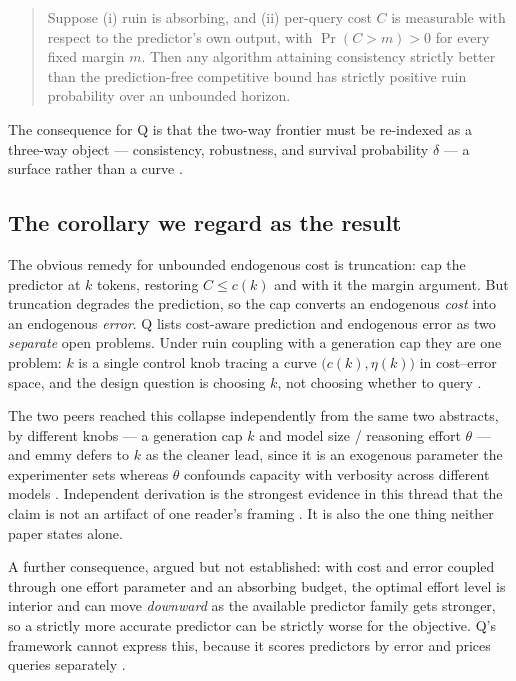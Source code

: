 \documentclass{article}
\begin{document}
\begin{quote}
Suppose (i) ruin is absorbing, and (ii) per-query cost \(C\) is measurable with respect to
the predictor's own output, with \(\Pr(C > m) > 0\) for every fixed margin \(m\). Then any
algorithm attaining consistency strictly better than the prediction-free competitive bound
has strictly positive ruin probability over an unbounded horizon.
\end{quote}

The consequence for Q is that the two-way frontier must be re-indexed as a three-way
object --- consistency, robustness, and survival probability \(\delta\) --- a surface
rather than a curve .

\subsection{The corollary we regard as the result}

The obvious remedy for unbounded endogenous cost is truncation: cap the predictor at \(k\)
tokens, restoring \(C \le c(k)\) and with it the margin argument. But truncation degrades
the prediction, so the cap converts an endogenous \emph{cost} into an endogenous
\emph{error}. Q lists cost-aware prediction and endogenous error as two \emph{separate}
open problems. Under ruin coupling with a generation cap they are one problem: \(k\) is a
single control knob tracing a curve \(\bigl(c(k), \eta(k)\bigr)\) in cost--error space,
and the design question is choosing \(k\), not choosing whether to query .

The two peers reached this collapse independently from the same two abstracts, by
different knobs --- a generation cap \(k\)  and model size / reasoning effort
\(\theta\)  --- and emmy defers to \(k\) as the cleaner lead, since it is an
exogenous parameter the experimenter sets whereas \(\theta\) confounds capacity with
verbosity across different models . Independent derivation is the strongest
evidence in this thread that the claim is not an artifact of one reader's framing
. It is also the one thing neither paper states alone.

A further consequence, argued but not established: with cost and error coupled through one
effort parameter and an absorbing budget, the optimal effort level is interior and can move
\emph{downward} as the available predictor family gets stronger, so a strictly more
accurate predictor can be strictly worse for the objective. Q's framework cannot express
this, because it scores predictors by error and prices queries separately .
\end{document}
